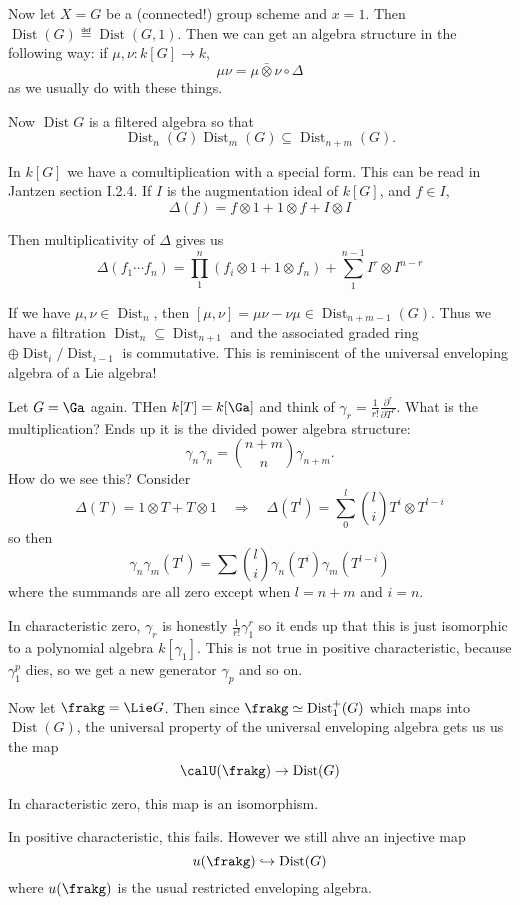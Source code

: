 \documentclass[12pt]{article}
\DeclareMathOperator{\Dist}{Dist}
\begin{document}
Now let $X=G$ be a (connected!) group scheme and $x=1$. Then $\Dist(G)\eqdef\Dist(G,1)$. 
Then we can get an algebra structure in the following way: if $\mu,\nu:k[G]\to k$,
\[\mu\nu=\mu\bar\otimes\nu\circ\Delta\]
as we usually do with these things. 

Now $\Dist G$ is a filtered algebra so that 
\[\Dist_n(G)\Dist_m(G)\subseteq\Dist_{n+m}(G).\]
\begin{rmk}
	In $k[G]$ we have a comultiplication with a special form. This can be read in Jantzen section I.2.4. If $I$ is the 
	augmentation ideal of $k[G]$, and $f\in I$,
	\[\Delta(f)=f\otimes 1+1\otimes f+I\otimes I\]

	Then multiplicativity of $\Delta$ gives us 
	\[\Delta(f_1\cdots f_n)=\prod_1^n(f_i\otimes 1+1\otimes f_n)+\sum_1^{n-1}I^r\otimes I^{n-r}\]
\end{rmk}

If we have $\mu,\nu\in\Dist_n$, then $[\mu,\nu]=\mu\nu-\nu\mu\in\Dist_{n+m-1}(G)$.
Thus we have a filtration $\Dist_n\subseteq \Dist_{n+1}$ and the associated graded ring 
$\oplus \Dist_i/\Dist_{i-1}$ is commutative. This is reminiscent of the universal enveloping algebra of a Lie algebra!
\begin{ex}
	Let $G=\Ga$ again. THen $k[T]=k[\Ga]$ and think of $\gamma_r=\frac{1}{r!}\frac{\partial^r}{\partial T^r}$.
	What is the multiplication? Ends up it is the divided power algebra structure:
	\[\gamma_n\gamma_n=\binom{n+m}{n}\gamma_{n+m}.\]
	How do we see this? Consider 
	\[\Delta(T)=1\otimes T+T\otimes 1\quad\Rightarrow\quad \Delta(T^l)=\sum_0^l\binom{l}{i}T^i\otimes T^{l-i}\]
	so then 
	\[\gamma_n\gamma_m(T^l)=\sum\binom{l}{i}\gamma_n(T^i)\gamma_m(T^{l-i})\]
	where the summands are all zero except when $l=n+m$ and $i=n$.

	In characteristic zero, $\gamma_r$ is honestly $\frac{1}{r!}\gamma_1^r$ so it ends up that this is just isomorphic
	to a polynomial algebra $k[\gamma_1]$. This is not true in positive characteristic, because $\gamma_1^p$ dies, so we get a new 
	generator $\gamma_p$ and so on.
\end{ex}
Now let $\frakg=\Lie G$. Then since $\frakg\simeq\Dist^+_1(G)$ which maps into $\Dist(G)$, the universal property 
of the universal enveloping algebra gets us us the map 
\[\calU(\frakg)\to \Dist(G)\]
\begin{prop}
	In characteristic zero, this map is an isomorphism.
\end{prop}
In positive characteristic, this fails. However we still ahve an injective map 
\[u(\frakg)\hookrightarrow\Dist(G)\]
where $u(\frakg)$ is the usual restricted enveloping algebra.
\end{document}
